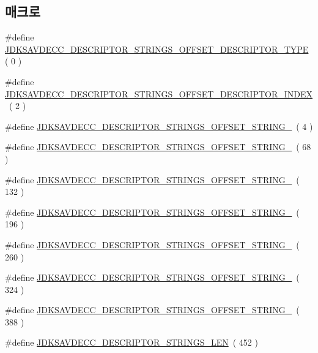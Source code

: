 \subsection*{매크로}
\begin{DoxyCompactItemize}
\item 
\#define \hyperlink{group__descriptor__strings_gab1dc6ebdf66d887e60fa02f919e13546}{J\+D\+K\+S\+A\+V\+D\+E\+C\+C\+\_\+\+D\+E\+S\+C\+R\+I\+P\+T\+O\+R\+\_\+\+S\+T\+R\+I\+N\+G\+S\+\_\+\+O\+F\+F\+S\+E\+T\+\_\+\+D\+E\+S\+C\+R\+I\+P\+T\+O\+R\+\_\+\+T\+Y\+PE}~( 0 )
\item 
\#define \hyperlink{group__descriptor__strings_gad6afb0c442d9358e720d2dbb4066f580}{J\+D\+K\+S\+A\+V\+D\+E\+C\+C\+\_\+\+D\+E\+S\+C\+R\+I\+P\+T\+O\+R\+\_\+\+S\+T\+R\+I\+N\+G\+S\+\_\+\+O\+F\+F\+S\+E\+T\+\_\+\+D\+E\+S\+C\+R\+I\+P\+T\+O\+R\+\_\+\+I\+N\+D\+EX}~( 2 )
\item 
\#define \hyperlink{group__descriptor__strings_gab9913a38c283200ad176d5101dfa248f}{J\+D\+K\+S\+A\+V\+D\+E\+C\+C\+\_\+\+D\+E\+S\+C\+R\+I\+P\+T\+O\+R\+\_\+\+S\+T\+R\+I\+N\+G\+S\+\_\+\+O\+F\+F\+S\+E\+T\+\_\+\+S\+T\+R\+I\+N\+G\+\_}~( 4 )
\item 
\#define \hyperlink{group__descriptor__strings_ga21ae751b7b93d84d434ea47ef184fba2}{J\+D\+K\+S\+A\+V\+D\+E\+C\+C\+\_\+\+D\+E\+S\+C\+R\+I\+P\+T\+O\+R\+\_\+\+S\+T\+R\+I\+N\+G\+S\+\_\+\+O\+F\+F\+S\+E\+T\+\_\+\+S\+T\+R\+I\+N\+G\+\_}~( 68 )
\item 
\#define \hyperlink{group__descriptor__strings_ga8966d8df8fc961cf0b4f4c04fe0c4474}{J\+D\+K\+S\+A\+V\+D\+E\+C\+C\+\_\+\+D\+E\+S\+C\+R\+I\+P\+T\+O\+R\+\_\+\+S\+T\+R\+I\+N\+G\+S\+\_\+\+O\+F\+F\+S\+E\+T\+\_\+\+S\+T\+R\+I\+N\+G\+\_}~( 132 )
\item 
\#define \hyperlink{group__descriptor__strings_ga7c7468f55f4795e19fc7371cc2799d12}{J\+D\+K\+S\+A\+V\+D\+E\+C\+C\+\_\+\+D\+E\+S\+C\+R\+I\+P\+T\+O\+R\+\_\+\+S\+T\+R\+I\+N\+G\+S\+\_\+\+O\+F\+F\+S\+E\+T\+\_\+\+S\+T\+R\+I\+N\+G\+\_}~( 196 )
\item 
\#define \hyperlink{group__descriptor__strings_ga14a1e954234814b95c851713024e54be}{J\+D\+K\+S\+A\+V\+D\+E\+C\+C\+\_\+\+D\+E\+S\+C\+R\+I\+P\+T\+O\+R\+\_\+\+S\+T\+R\+I\+N\+G\+S\+\_\+\+O\+F\+F\+S\+E\+T\+\_\+\+S\+T\+R\+I\+N\+G\+\_}~( 260 )
\item 
\#define \hyperlink{group__descriptor__strings_ga7452da8765c20c1f989387e87405884b}{J\+D\+K\+S\+A\+V\+D\+E\+C\+C\+\_\+\+D\+E\+S\+C\+R\+I\+P\+T\+O\+R\+\_\+\+S\+T\+R\+I\+N\+G\+S\+\_\+\+O\+F\+F\+S\+E\+T\+\_\+\+S\+T\+R\+I\+N\+G\+\_}~( 324 )
\item 
\#define \hyperlink{group__descriptor__strings_gae31e4c4768feeaf8602908c8f7a05cd3}{J\+D\+K\+S\+A\+V\+D\+E\+C\+C\+\_\+\+D\+E\+S\+C\+R\+I\+P\+T\+O\+R\+\_\+\+S\+T\+R\+I\+N\+G\+S\+\_\+\+O\+F\+F\+S\+E\+T\+\_\+\+S\+T\+R\+I\+N\+G\+\_}~( 388 )
\item 
\#define \hyperlink{group__descriptor__strings_ga1a0c88a9f0306c420ea4d28e147f400e}{J\+D\+K\+S\+A\+V\+D\+E\+C\+C\+\_\+\+D\+E\+S\+C\+R\+I\+P\+T\+O\+R\+\_\+\+S\+T\+R\+I\+N\+G\+S\+\_\+\+L\+EN}~( 452 )
\end{DoxyCompactItemize}
